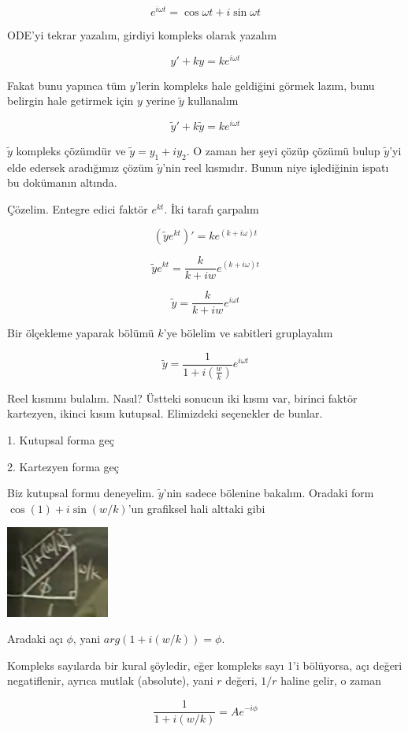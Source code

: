 \documentclass[12pt,fleqn]{article}\usepackage{../../common}
\begin{document}
$$ e^{i\omega t} = \cos \omega t + i \sin \omega t $$

ODE'yi tekrar yazalım, girdiyi kompleks olarak yazalım

$$ y' + ky = k e^{i\omega t} $$

Fakat bunu yapınca tüm $y$'lerin kompleks hale geldiğini görmek lazım, bunu
belirgin hale getirmek için $y$ yerine $\tilde{y}$ kullanalım

$$  \tilde{y}' + k\tilde{y} = k e^{i\omega t}  $$

$\tilde{y}$ kompleks çözümdür ve $\tilde{y} = y_1 + iy_2$. O zaman her şeyi
çözüp çözümü bulup $\tilde{y}$'yi elde edersek aradığımız çözüm
$\tilde{y}$'nin reel kısmıdır. Bunun niye işlediğinin ispatı bu dokümanın
altında.

Çözelim. Entegre edici faktör $e^{kt}$. İki tarafı çarpalım

$$ (\tilde{y} e^{kt} )' = k e^{(k + i\omega)t}  $$

$$ \tilde{y}e^{kt} = \frac{k}{k+iw} e^{(k+i\omega)t}$$

$$ \tilde{y} = \frac{k}{k+iw} e^{i\omega t}$$

Bir ölçekleme yaparak bölümü $k$'ye bölelim ve sabitleri gruplayalım

$$ \tilde{y} = \frac{1}{1+i(\frac{w}{k})} e^{i\omega t}$$

Reel kısmını bulalım. Nasıl? Üstteki sonucun iki kısmı var, birinci faktör
kartezyen, ikinci kısım kutupsal. Elimizdeki seçenekler de bunlar. 

1. Kutupsal forma geç

2. Kartezyen forma geç

Biz kutupsal formu deneyelim. $\tilde{y}$'nin sadece bölenine bakalım. Oradaki
form $\cos(1) + i\sin(w/k)$'un grafiksel hali alttaki gibi

\includegraphics[height=3cm]{7_4.png}

Aradaki açı $\phi$, yani $arg(1+i(w/k)) = \phi$. 

Kompleks sayılarda bir kural şöyledir, eğer kompleks sayı 1'i bölüyorsa,
açı değeri negatiflenir, ayrıca mutlak (absolute), yani $r$ değeri, $1/r$
haline gelir, o zaman

$$ \frac{1}{1+i(w/k)} = A e^{-i\phi} $$
\end{document}
